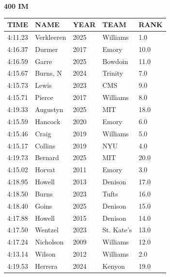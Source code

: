 \begin{table}[H]
\centering
\begin{minipage}[t]{0.6\textwidth}
\centering
\textbf{400 IM}\\[0.1cm]
\begin{tabular}{@{}p{1.8cm}p{2.8cm}p{1.2cm}p{1.4cm}p{0.8cm}@{}}
\hline
    \textbf{TIME} & \textbf{NAME} & \textbf{YEAR} & \textbf{TEAM} & \textbf{RANK} \\
\hline
    4:11.23 & Verkleeren & 2025 & Williams & 1.0 \\
    4:16.37 & Durmer & 2017 & Emory & 10.0 \\
    4:16.59 & Garre & 2025 & Bowdoin & 11.0 \\
    4:15.67 & Burns, N & 2024 & Trinity & 7.0 \\
    4:15.73 & Lewis & 2023 & CMS & 9.0 \\
    4:15.71 & Pierce & 2017 & Williams & 8.0 \\
    4:19.33 & Augustyn & 2025 & MIT & 18.0 \\
    4:15.59 & Hancock & 2020 & Emory & 6.0 \\
    4:15.46 & Craig & 2019 & Williams & 5.0 \\
    4:15.17 & Collins & 2019 & NYU & 4.0 \\
    4:19.73 & Bernard & 2025 & MIT & 20.0 \\
    4:15.02 & Horvat & 2011 & Emory & 3.0 \\
    4:18.95 & Howell & 2013 & Denison & 17.0 \\
    4:18.50 & Burns & 2023 & Tufts & 16.0 \\
    4:18.40 & Goins & 2025 & Denison & 15.0 \\
    4:17.88 & Howell & 2015 & Denison & 14.0 \\
    4:17.50 & Wentzel & 2023 & St. Kate's & 13.0 \\
    4:17.24 & Nicholson & 2009 & Williams & 12.0 \\
    4:13.14 & Wilson & 2012 & Williams & 2.0 \\
    4:19.53 & Herrera & 2024 & Kenyon & 19.0 \\
\hline
\end{tabular}
\end{minipage}
\end{table}

